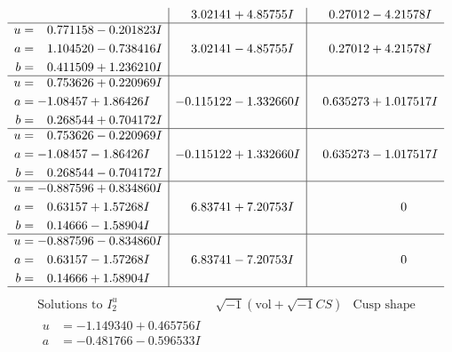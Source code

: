 \documentclass[1p]{elsarticle_modified}
\theoremstyle{definition}
\newcommand{\I}{\sqrt{-1}}
\begin{document}
$$\begin{array}{c|c|c}
 & \phantom{-}3.02141 + 4.85755 I & \phantom{-}0.27012 - 4.21578 I \\ \hline\begin{aligned}
u &= \phantom{-}0.771158 - 0.201823 I \\
a &= \phantom{-}1.104520 - 0.738416 I \\
b &= \phantom{-}0.411509 + 1.236210 I\end{aligned}
 & \phantom{-}3.02141 - 4.85755 I & \phantom{-}0.27012 + 4.21578 I \\ \hline\begin{aligned}
u &= \phantom{-}0.753626 + 0.220969 I \\
a &= -1.08457 + 1.86426 I \\
b &= \phantom{-}0.268544 + 0.704172 I\end{aligned}
 & -0.115122 - 1.332660 I & \phantom{-}0.635273 + 1.017517 I \\ \hline\begin{aligned}
u &= \phantom{-}0.753626 - 0.220969 I \\
a &= -1.08457 - 1.86426 I \\
b &= \phantom{-}0.268544 - 0.704172 I\end{aligned}
 & -0.115122 + 1.332660 I & \phantom{-}0.635273 - 1.017517 I \\ \hline\begin{aligned}
u &= -0.887596 + 0.834860 I \\
a &= \phantom{-}0.63157 + 1.57268 I \\
b &= \phantom{-}0.14666 - 1.58904 I\end{aligned}
 & \phantom{-}6.83741 + 7.20753 I & \phantom{-0.000000 } 0 \\ \hline\begin{aligned}
u &= -0.887596 - 0.834860 I \\
a &= \phantom{-}0.63157 - 1.57268 I \\
b &= \phantom{-}0.14666 + 1.58904 I\end{aligned}
 & \phantom{-}6.83741 - 7.20753 I & \phantom{-0.000000 } 0\\
 \hline 
 \end{array}$$\newpage$$\begin{array}{c|c|c}  
\text{Solutions to }I^u_{2}& \I (\text{vol} + \sqrt{-1}CS) & \text{Cusp shape}\\
 \hline 
\begin{aligned}
u &= -1.149340 + 0.465756 I \\
a &= -0.481766 - 0.596533 I \\

\end{aligned}
\end{array}$$
\end{document}
